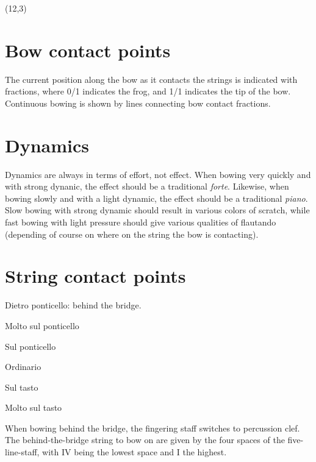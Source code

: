 \documentclass[10pt]{article}
\begin{document}
\begin{textblock}{11}(12,3)

    \section{Bow contact points}

    The current position along the bow as it contacts the strings is indicated
    with fractions, where 0/1 indicates the frog, and 1/1 indicates the tip of
    the bow. Continuous bowing is shown by lines connecting bow contact
    fractions.

    \section{Dynamics}

    Dynamics are always in terms of effort, not effect. When bowing very
    quickly and with strong dynanic, the effect should be a traditional
    \emph{forte}. Likewise, when bowing slowly and with a light dynamic, the
    effect should be a traditional \emph{piano}. Slow bowing with strong
    dynamic should result in various colors of scratch, while fast bowing with
    light pressure should give various qualities of flautando (depending of
    course on where on the string the bow is contacting).

    \section{String contact points}

    \begin{description}[style=nextline]
        \item[D.P.]
            Dietro ponticello: behind the bridge.
        \item[M.S.P.]
            Molto sul ponticello
        \item[S.P.]
            Sul ponticello
        \item[Ord.]
            Ordinario
        \item[S.T.]
            Sul tasto
        \item[M.S.T.]
            Molto sul tasto
    \end{description}

    When bowing behind the bridge, the fingering staff switches to percussion
    clef. The behind-the-bridge string to bow on are given by the four spaces
    of the five-line-staff, with IV being the lowest space and I the highest.


\end{textblock}
\end{document}
